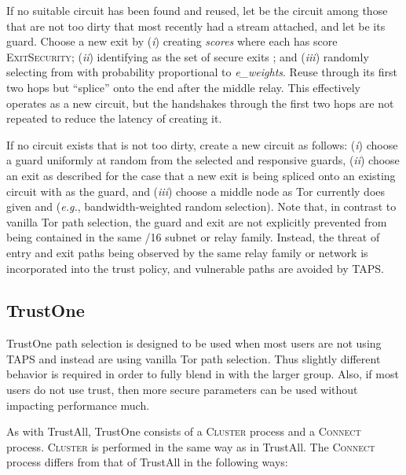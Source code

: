 \documentclass[conference]{styles/IEEEtran}
\newcommand{\eg}{\emph{e.g.}}
\newcommand{\ps}{TAPS\xspace}
\begin{document}
If no suitable circuit has been found and reused, let  be the circuit among those that are
not too dirty that most recently had a stream attached, and let  be its guard. Choose a
new exit  by (\emph{i}) creating \textit{scores} where each  has score
\textsc{ExitSecurity}; (\emph{ii})
identifying as the set of secure exits
; and
(\emph{iii}) randomly selecting from  with probability proportional to \textit{e\_weights}.
Reuse  through its first two hops but ``splice''  onto the end after the middle relay.
This effectively operates as a new circuit, but the handshakes through the first two
hops are not repeated to reduce the latency of creating it.

If no circuit exists that is not too dirty, create a new circuit as follows: (\emph{i})
choose a guard  uniformly at random from the  selected and responsive guards, (\emph{ii})
choose an exit  as described for the case that a new exit is being spliced onto an existing
circuit with  as the guard,
and (\emph{iii})
choose a middle node as Tor currently does given  and  (\eg{}, bandwidth-weighted random
selection).  Note that, in contrast
to vanilla Tor path selection, the guard and exit are not explicitly prevented from being contained
in the same /16 subnet or relay family. Instead, the threat of entry and exit paths being observed
by the same relay family or network is incorporated into the trust policy, and vulnerable paths are
avoided by \ps.


\subsection{TrustOne}
TrustOne path selection is designed to be used when most users are not using \ps and instead are
using vanilla Tor path selection. Thus slightly different behavior is required in order to fully
blend in with the larger group. Also, if most users do not use trust, then more secure parameters
can be used without impacting performance much.

As with TrustAll, TrustOne consists of a \textsc{Cluster} process and a \textsc{Connect} process.
\textsc{Cluster} is performed in the same way as in TrustAll. The \textsc{Connect} process differs
from that of TrustAll in the following ways:
\end{document}
